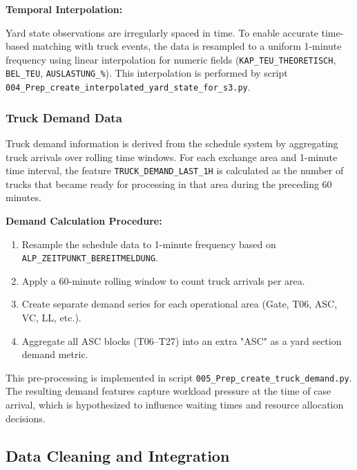         \textbf{Temporal Interpolation:}
        
        Yard state observations are irregularly spaced in time. To enable accurate time-based matching with truck events, the data is resampled to a uniform 1-minute frequency using linear interpolation for numeric fields (\texttt{KAP\_TEU\_THEORETISCH}, \texttt{BEL\_TEU}, \texttt{AUSLASTUNG\_\%}). This interpolation is performed by script \texttt{004\_Prep\_create\_interpolated\_yard\_state\_for\_s3.py}.

        \subsubsection{Truck Demand Data}

        Truck demand information is derived from the schedule system by aggregating truck arrivals over rolling time windows. For each exchange area and 1-minute time interval, the feature \texttt{TRUCK\_DEMAND\_LAST\_1H} is calculated as the number of trucks that became ready for processing in that area during the preceding 60 minutes.
        
        \textbf{Demand Calculation Procedure:}
        
        \begin{enumerate}
            \item Resample the schedule data to 1-minute frequency based on \texttt{ALP\_ZEITPUNKT\_BEREITMELDUNG}.
            \item Apply a 60-minute rolling window to count truck arrivals per area.
            \item Create separate demand series for each operational area (Gate, T06, ASC, VC, LL, etc.).
            \item Aggregate all ASC blocks (T06--T27) into an extra "ASC" as a yard section demand metric.
        \end{enumerate}
        
        This pre-processing is implemented in script \texttt{005\_Prep\_create\_truck\_demand.py}. The resulting demand features capture workload pressure at the time of case arrival, which is hypothesized to influence waiting times and resource allocation decisions.
        
            
    \subsection{Data Cleaning and Integration}

